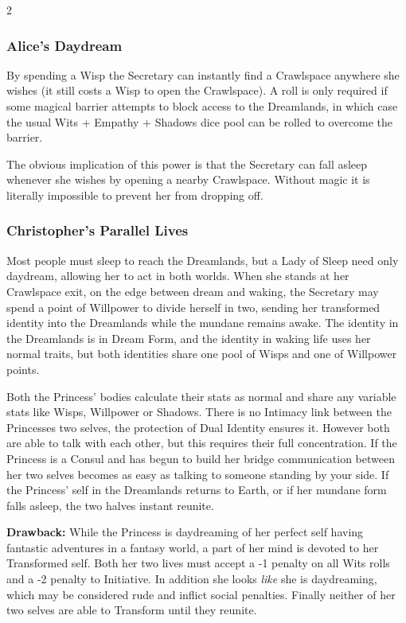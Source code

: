\begin{multicols}{2}
\subsubsection*{Alice's Daydream}

By spending a Wisp the Secretary can instantly find a Crawlspace anywhere she wishes (it still costs a Wisp to open the Crawlspace). A roll is only required if some magical barrier attempts to block access to the Dreamlands, in which case the usual Wits + Empathy + Shadows dice pool can be rolled to overcome the barrier.

The obvious implication of this power is that the Secretary can fall asleep whenever she wishes by opening a nearby Crawlspace. Without magic it is literally impossible to prevent her from dropping off.  

\subsubsection*{Christopher's Parallel Lives}

Most people must sleep to reach the Dreamlands, but a Lady of Sleep need only daydream, allowing her to act in both worlds. When she stands at her Crawlspace exit, on the edge between dream and waking, the Secretary may spend a point of Willpower to divide herself in two, sending her transformed identity into the Dreamlands while the mundane remains awake. The identity in the Dreamlands is in Dream Form, and the identity in waking life uses her normal traits, but both identities share one pool of Wisps and one of Willpower points.

Both the Princess' bodies calculate their stats as normal and share any variable stats like Wisps, Willpower or Shadows. There is no Intimacy link between the Princesses two selves, the protection of Dual Identity ensures it. However both are able to talk with each other, but this requires their full concentration. If the Princess is a Consul and has begun to build her bridge communication between her two selves becomes as easy as talking to someone standing by your side. If the Princess' self in the Dreamlands returns to Earth, or if her mundane form falls asleep, the two halves instant reunite.

\textbf{Drawback:} While the Princess is daydreaming of her perfect self having fantastic adventures in a fantasy world, a part of her mind is devoted to her Transformed self. Both her two lives must accept a -1 penalty on all Wits rolls and a -2 penalty to Initiative. In addition she looks \textit{like} she is daydreaming, which may be considered rude and inflict social penalties. Finally neither of her two selves are able to Transform until they reunite. 


\end{multicols}
